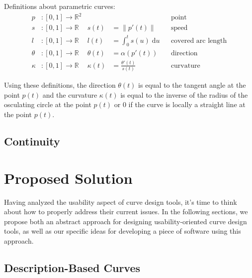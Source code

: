 \documentclass[a4paper]{article}
\newcommand{\apply}[2]{#1\!\left(#2\right)}
\begin{document}
			Definitions about parametric curves:
			\begin{align*}
				p                & : \left[0,1\right] \rightarrow \mathbb{R}^2 &                   &                                           && \text{point}\\
				s                & : \left[0,1\right] \rightarrow \mathbb{R}   & \apply{s}{t}      & = \left\|\apply{p'}{t}\right\|            && \text{speed}\\
				l                & : \left[0,1\right] \rightarrow \mathbb{R}   & \apply{l}{t}      & = \int_{0}^{t}\apply{s}{u}\;\mathrm{d}u   && \text{covered arc length}\\
				\theta           & : \left[0,1\right] \rightarrow \mathbb{R}   & \apply{\theta}{t} & = \apply{\alpha}{\apply{p'}{t}}           && \text{direction}\\
				\kappa           & : \left[0,1\right] \rightarrow \mathbb{R}   & \apply{\kappa}{t} & = \frac{\apply{\theta'}{t}}{\apply{s}{t}} && \text{curvature}
			\end{align*}

			Using these definitions, the direction \(\apply{\theta}{t}\) is equal to the tangent angle at the point \(\apply{p}{t}\) and the curvature \(\apply{\kappa}{t}\) is equal to the inverse of the radius of the osculating circle at the point \(\apply{p}{t}\) or \(0\) if the curve is locally a straight line at the point \(\apply{p}{t}\).

		\subsection{Continuity}
		\label{section:continuity}


	\section{Proposed Solution}
	\label{section:proposed_solution}

		Having analyzed the usability aspect of curve design tools, it's time to think about how to properly address their current issues. In the following sections, we propose both an abstract approach for designing usability-oriented curve design tools, as well as our specific ideas for developing a piece of software using this approach.
          
		\subsection{Description-Based Curves}
		\label{section:description-based_curves}
\end{document}
